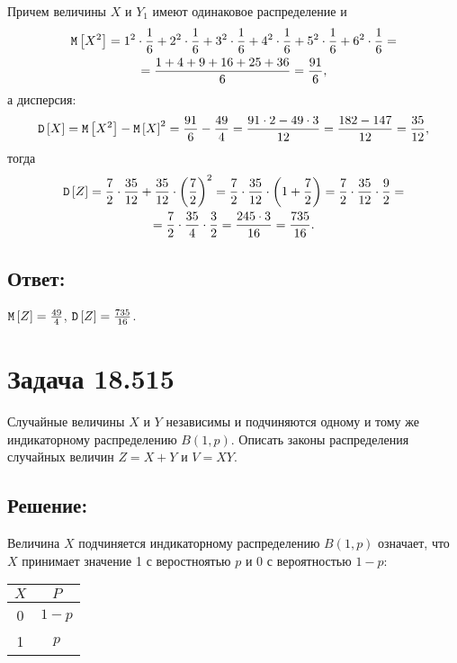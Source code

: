 Причем величины $X$ и $Y_1$ имеют одинаковое распределение и
\begin{multline}
    \mathtt{M} \left [ X^2 \right ]
    = 1^2 \cdot \frac{1}{6} + 2^2 \cdot \frac{1}{6} + 3^2 \cdot \frac{1}{6} + 4^2 \cdot \frac{1}{6} + 5^2 \cdot \frac{1}{6} + 6^2 \cdot \frac{1}{6} = \\
    = \frac{1 + 4 + 9 + 16 + 25 + 36}{6}
    = \frac{91}{6},
\end{multline}
а дисперсия:
\begin{equation}
    \mathtt{D} \left [ X \right ]
    = \mathtt{M} \left [ X^2 \right ] - \mathtt{M} \left [ X \right ]^2
    = \frac{91}{6} - \frac{49}{4}
    = \frac{91 \cdot 2 - 49 \cdot 3}{12}
    = \frac{182 - 147}{12}
    = \frac{35}{12},
\end{equation}
тогда
\begin{multline}
    \mathtt{D} \left [ Z \right ]
    = \frac{7}{2} \cdot \frac{35}{12} + \frac{35}{12} \cdot \left ( \frac{7}{2} \right )^2
    = \frac{7}{2} \cdot \frac{35}{12} \cdot \left ( 1 + \frac{7}{2} \right )
    = \frac{7}{2} \cdot \frac{35}{12} \cdot \frac{9}{2} = \\
    = \frac{7}{2} \cdot \frac{35}{4} \cdot \frac{3}{2}
    = \frac{245 \cdot 3}{16}
    = \frac{735}{16}.
\end{multline}

\subsection*{Ответ:}
$\mathtt{M} \left [ Z \right ] = \frac{49}{4}$, $\mathtt{D} \left [ Z \right ] = \frac{735}{16}$.

\section*{Задача 18.515}

Случайные величины $X$ и $Y$ независимы и подчиняются одному и тому же индикаторному распределению $B(1,p)$. Описать законы распределения случайных величин
$Z = X + Y$ и $V = X Y$.
\subsection*{Решение:}
Величина $X$ подчиняется индикаторному распределению $B(1,p)$ означает, что $X$ принимает значение 1 с веростноятью $p$ и 0 с вероятностью $1-p$:

\begin{tabular}{|c|c|}
    \hline
    $X$ & $P$   \\
    \hline
    0   & $1-p$ \\
    \hline
    1   & $p$   \\
    \hline
\end{tabular}

